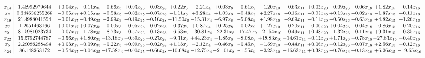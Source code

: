 \documentclass[9pt]{article}
\begin{document}
\[\begin{array}{c| c c@{\hskip 2pt} c@{\hskip 2pt} c@{\hskip 2pt} c@{\hskip 2pt} c@{\hskip 2pt} c@{\hskip 2pt} c@{\hskip 2pt} c@{\hskip 2pt} c@{\hskip 2pt} c@{\hskip 2pt} c@{\hskip 2pt} c@{\hskip 2pt} c@{\hskip 2pt} c@{\hskip 2pt} c@{\hskip 2pt} c@{\hskip 2pt} }
 x_{14}   &  1.48992979644 & +  0.04 x_{17} & -0.11 x_{35} & +  0.66 x_{3} & +  0.03 x_{25} & +  0.03 x_{28} & +  0.22 x_{6} & -2.21 x_{4} & +  0.03 x_{8} & -0.61 x_{9} & -1.20 x_{10} & +  0.63 x_{11} & +  0.02 x_{20} & -0.09 x_{26} & +  0.06 x_{18} & +  1.82 x_{15} & +  0.14 x_{16}\\
 x_{2}   &  0.348636255269 & -0.05 x_{17} & +  0.15 x_{35} & -0.58 x_{3} & -0.02 x_{25} & +  0.07 x_{28} & -1.11 x_{6} & +  3.28 x_{4} & +  1.03 x_{8} & +  0.48 x_{9} & +  2.27 x_{10} & -0.16 x_{11} & -0.05 x_{20} & +  0.13 x_{26} & -0.02 x_{18} & -1.87 x_{15} & +  0.11 x_{16}\\
 x_{19}   &  21.4988041554 & -0.01 x_{17} & -0.49 x_{35} & +  2.99 x_{3} & -0.49 x_{25} & -0.10 x_{28} & -11.50 x_{6} & -15.31 x_{4} & -6.97 x_{8} & +  5.08 x_{9} & +  1.98 x_{10} & -9.69 x_{11} & -0.11 x_{20} & -0.50 x_{26} & -0.63 x_{18} & +  4.82 x_{15} & +  1.26 x_{16}\\
 x_{7}   &  1.2051463166 & +  0.01 x_{17} & +  0.07 x_{35} & -0.00 x_{3} & -0.05 x_{25} & +  0.02 x_{28} & -0.37 x_{6} & +  0.87 x_{4} & +  0.25 x_{8} & -0.02 x_{9} & +  1.27 x_{10} & -0.20 x_{11} & -0.00 x_{20} & +  0.04 x_{26} & -0.04 x_{18} & -0.86 x_{15} & -0.20 x_{16}\\
 x_{21}   &  81.5981023734 & -0.07 x_{17} & -1.78 x_{35} & +  8.73 x_{3} & -0.57 x_{25} & -0.13 x_{28} & -6.53 x_{6} & -30.81 x_{4} & -22.31 x_{8} & -17.47 x_{9} & -21.54 x_{10} & -0.49 x_{11} & +  0.48 x_{20} & -1.32 x_{26} & -0.11 x_{18} & +  9.31 x_{15} & +  0.35 x_{16}\\
 x_{22}   &  15.5792744787 & -0.56 x_{17} & +  1.80 x_{35} & -13.18 x_{3} & -0.69 x_{25} & +  0.27 x_{28} & -9.31 x_{6} & + 44.23 x_{4} & -1.85 x_{8} & +  8.08 x_{9} & + 19.83 x_{10} & -14.61 x_{11} & -0.12 x_{20} & +  1.71 x_{26} & -0.78 x_{18} & -27.83 x_{15} & -0.40 x_{16}\\
 x_{5}   &  2.29086288494 & +  0.03 x_{17} & -0.09 x_{35} & -0.22 x_{3} & +  0.09 x_{25} & +  0.02 x_{28} & +  1.13 x_{6} & -2.12 x_{4} & -0.46 x_{8} & -0.45 x_{9} & -1.59 x_{10} & +  0.44 x_{11} & +  0.06 x_{20} & -0.12 x_{26} & +  0.07 x_{18} & +  2.56 x_{15} & -0.12 x_{16}\\
 x_{24}   &  86.148263172 & -0.54 x_{17} & -0.04 x_{35} & -17.58 x_{3} & -0.00 x_{25} & -0.60 x_{28} & + 10.68 x_{6} & -12.75 x_{4} & -21.01 x_{8} & -1.55 x_{9} & -2.23 x_{10} & -16.63 x_{11} & +  0.38 x_{20} & -0.76 x_{26} & +  0.13 x_{18} & +  6.26 x_{15} & -19.65 x_{16}\\

\end{array}\]
\end{document}
